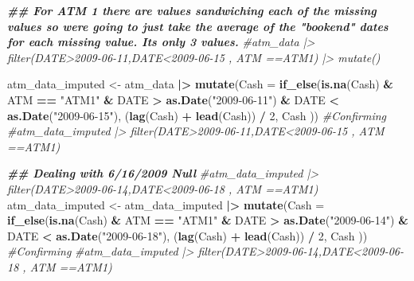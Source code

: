 \documentclass[
]{article}
\newenvironment{Shaded}{\begin{snugshade}}{\end{snugshade}}
\newcommand{\AttributeTok}[1]{\textcolor[rgb]{0.13,0.29,0.53}{#1}}
\newcommand{\CommentTok}[1]{\textcolor[rgb]{0.56,0.35,0.01}{\textit{#1}}}
\newcommand{\DecValTok}[1]{\textcolor[rgb]{0.00,0.00,0.81}{#1}}
\newcommand{\DocumentationTok}[1]{\textcolor[rgb]{0.56,0.35,0.01}{\textbf{\textit{#1}}}}
\newcommand{\FunctionTok}[1]{\textcolor[rgb]{0.13,0.29,0.53}{\textbf{#1}}}
\newcommand{\NormalTok}[1]{#1}
\newcommand{\OtherTok}[1]{\textcolor[rgb]{0.56,0.35,0.01}{#1}}
\newcommand{\SpecialCharTok}[1]{\textcolor[rgb]{0.81,0.36,0.00}{\textbf{#1}}}
\newcommand{\StringTok}[1]{\textcolor[rgb]{0.31,0.60,0.02}{#1}}
\begin{document}
\begin{Shaded}
\begin{Highlighting}[]
\DocumentationTok{\#\# For ATM 1 there are values sandwiching each of the missing values so were going to just take the average of the "bookend" dates for each missing value. Its only 3 values.}
\CommentTok{\#atm\_data |\textgreater{} filter(DATE\textgreater{}\textquotesingle{}2009{-}06{-}11\textquotesingle{},DATE\textless{}\textquotesingle{}2009{-}06{-}15\textquotesingle{} , ATM ==\textquotesingle{}ATM1\textquotesingle{}) |\textgreater{} mutate()}

\NormalTok{atm\_data\_imputed }\OtherTok{\textless{}{-}}\NormalTok{ atm\_data }\SpecialCharTok{|\textgreater{}} \FunctionTok{mutate}\NormalTok{(}\AttributeTok{Cash =} \FunctionTok{if\_else}\NormalTok{(}\FunctionTok{is.na}\NormalTok{(Cash) }\SpecialCharTok{\&}\NormalTok{ ATM }\SpecialCharTok{==} \StringTok{"ATM1"} \SpecialCharTok{\&}\NormalTok{ DATE }\SpecialCharTok{\textgreater{}} \FunctionTok{as.Date}\NormalTok{(}\StringTok{"2009{-}06{-}11"}\NormalTok{) }\SpecialCharTok{\&}\NormalTok{ DATE }\SpecialCharTok{\textless{}} \FunctionTok{as.Date}\NormalTok{(}\StringTok{"2009{-}06{-}15"}\NormalTok{),}
\NormalTok{                                  (}\FunctionTok{lag}\NormalTok{(Cash) }\SpecialCharTok{+} \FunctionTok{lead}\NormalTok{(Cash)) }\SpecialCharTok{/} \DecValTok{2}\NormalTok{, Cash ))}
\CommentTok{\#Confirming}
\CommentTok{\#atm\_data\_imputed |\textgreater{} filter(DATE\textgreater{}\textquotesingle{}2009{-}06{-}11\textquotesingle{},DATE\textless{}\textquotesingle{}2009{-}06{-}15\textquotesingle{} , ATM ==\textquotesingle{}ATM1\textquotesingle{})}

\DocumentationTok{\#\# Dealing with 6/16/2009 Null}
\CommentTok{\#atm\_data\_imputed |\textgreater{} filter(DATE\textgreater{}\textquotesingle{}2009{-}06{-}14\textquotesingle{},DATE\textless{}\textquotesingle{}2009{-}06{-}18\textquotesingle{} , ATM ==\textquotesingle{}ATM1\textquotesingle{})}
\NormalTok{atm\_data\_imputed }\OtherTok{\textless{}{-}}\NormalTok{ atm\_data\_imputed }\SpecialCharTok{|\textgreater{}} \FunctionTok{mutate}\NormalTok{(}\AttributeTok{Cash =} \FunctionTok{if\_else}\NormalTok{(}\FunctionTok{is.na}\NormalTok{(Cash) }\SpecialCharTok{\&}\NormalTok{ ATM }\SpecialCharTok{==} \StringTok{"ATM1"} \SpecialCharTok{\&}\NormalTok{ DATE }\SpecialCharTok{\textgreater{}} \FunctionTok{as.Date}\NormalTok{(}\StringTok{"2009{-}06{-}14"}\NormalTok{) }\SpecialCharTok{\&}\NormalTok{ DATE }\SpecialCharTok{\textless{}} \FunctionTok{as.Date}\NormalTok{(}\StringTok{"2009{-}06{-}18"}\NormalTok{),}
\NormalTok{                                  (}\FunctionTok{lag}\NormalTok{(Cash) }\SpecialCharTok{+} \FunctionTok{lead}\NormalTok{(Cash)) }\SpecialCharTok{/} \DecValTok{2}\NormalTok{, Cash ))}
\CommentTok{\#Confirming}
\CommentTok{\#atm\_data\_imputed |\textgreater{} filter(DATE\textgreater{}\textquotesingle{}2009{-}06{-}14\textquotesingle{},DATE\textless{}\textquotesingle{}2009{-}06{-}18\textquotesingle{} , ATM ==\textquotesingle{}ATM1\textquotesingle{})}


\end{Highlighting}
\end{Shaded}
\end{document}
